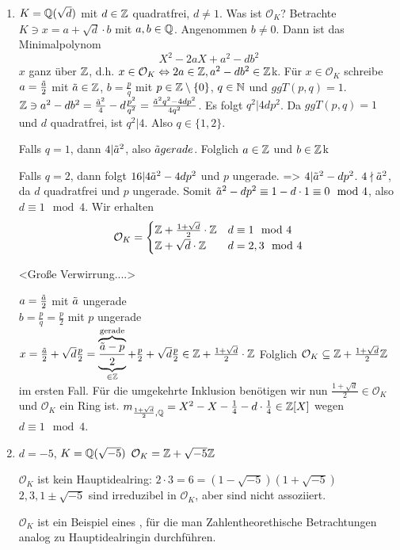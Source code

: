 \documentclass[../main.tex]{subfiles}
\begin{document}
\begin{example*} $ $
    \begin{enumerate}[label=(\arabic*)]
        \item $K=\mathbb{Q}(\sqrt{d})$ mit $d\in \mathbb{Z}$ quadratfrei, $d\neq 1$.
        Was ist $\mathcal{O}_K$? Betrachte $K\ni x = a+\sqrt{d}\cdot b$ mit $a,b\in \mathbb{Q}$.
        Angenommen $b\neq 0$. Dann ist das Minimalpolynom $$X^2-2aX+a^2-db^2$$
        $x$ ganz über $\mathbb{Z}$, d.h. $x\in \mathcal{O}_K\Leftrightarrow 2a\in \mathbb{Z}, a^2-db^2\in \mathbb{Z}$k.
        Für $x\in \mathcal{O}_K$ schreibe $a=\frac{\Tilde{a}}{2}$ mit $\Tilde{a}\in \mathbb{Z}$, $b=\frac{p}{q}$ mit $p\in \mathbb{Z}\setminus\{0\}$, $q\in \mathbb{N}$ und $ggT(p,q)=1$.
        $\mathbb{Z}\ni a^2 - db^2 = \frac{\Tilde{a}^2}{4}-d\frac{p^2}{q^2} = \frac{\Tilde{a}^2q^2-4dp^2}{4q^2}$.
        Es folgt $q^2|4dp^2$. Da $ggT(p,q)=1$ und $d$ quadratfrei, ist $q^2|4$. Also $q\in \{1,2\}$.

        Falls $q=1$, dann $4|\Tilde{a}^2$, also $\Tilde{a} gerade$.
        Folglich $a\in \mathbb{Z}$ und $b\in \mathbb{Z}$k

        Falls $q=2$, dann folgt $16| 4\Tilde{a}^2-4dp^2$ und $p$ ungerade. => $4|\Tilde{a}^2-dp^2$. $4\nmid \Tilde{a}^2$, da $d$ quadratfrei und $p$ ungerade.
        Somit $\Tilde{a}^2-dp^2 \equiv 1-d\cdot 1 \equiv 0\mod 4$, also $d\equiv 1 \mod 4$.
        Wir erhalten
        $$\mathcal{O}_K = \begin{cases}
            \mathbb{Z}+ \frac{1+\sqrt{d}}{2}\cdot \mathbb{Z} & d\equiv 1 \mod 4\\
            \mathbb{Z} + \sqrt{d} \cdot \mathbb{Z} & d= 2,3 \mod 4
        \end{cases}$$
        
        <Große Verwirrung....>
        
        $a=\frac{\Tilde{a}}{2}$ mit $\Tilde{a}$ ungerade\\
        $b=\frac{p}{q} = \frac{p}{2}$ mit $p$ ungerade\\
        $x=\frac{\Tilde{a}}{2}+\sqrt{d}\frac{p}{2} =\overbrace{\underbrace{\frac{\Tilde{a}-p}{2}}_{\in\mathbb{Z}}}^{\text{gerade}} + \frac{p}{2}+\sqrt{d}\frac{p}{2}\in \mathbb{Z} + \frac{1+\sqrt{d}}{2}\cdot \mathbb{Z}$
        Folglich $\mathcal{O}_K\subseteq \mathbb{Z} + \frac{1+\sqrt{d}}{2}\mathbb{Z}$ im ersten Fall.
        Für die umgekehrte Inklusion benötigen wir nun $\frac{1+\sqrt{d}}{2}\in \mathcal{O}_K$ und $\mathcal{O}_K$ ein Ring ist.
        $m_{\frac{1+\sqrt{d}}{2},\mathbb{Q}} = X^2 - X - \frac{1}{4}-d\cdot \frac{1}{4}\in \mathbb{Z}[X]$ wegen $d\equiv 1 \mod 4$.
        \item $d=-5$, $K=\mathbb{Q}(\sqrt{-5})$
        $\mathcal{O}_K = \mathbb{Z} + \sqrt{-5}\mathbb{Z}$

        $\mathcal{O}_K$ ist kein Hauptidealring:
        $2\cdot 3 = 6 = (1-\sqrt{-5})(1+\sqrt{-5})$
        $2,3,1\pm\sqrt{-5}$ sind irreduzibel in $\mathcal{O}_K$, aber sind nicht assoziiert.

        $\mathcal{O}_K$ ist ein Beispiel eines , für die man Zahlentheorethische Betrachtungen analog zu Hauptidealringin durchführen.
    \end{enumerate}
\end{example*}
\end{document}
